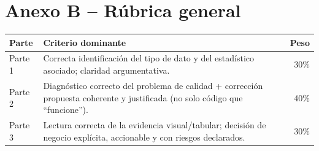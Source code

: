 \documentclass[11pt]{article}
\begin{document}
\section*{Anexo B -- Rúbrica general}
\begin{longtable}{p{2.5cm}p{9cm}r}
\toprule
Parte & Criterio dominante & Peso \\
\midrule
Parte 1 & Correcta identificación del tipo de dato y del estadístico asociado; claridad argumentativa. & 30\% \\
Parte 2 & Diagnóstico correcto del problema de calidad + corrección propuesta coherente y justificada (no solo código que ``funcione''). & 40\% \\
Parte 3 & Lectura correcta de la evidencia visual/tabular; decisión de negocio explícita, accionable y con riesgos declarados. & 30\% \\
\bottomrule
\end{longtable}
\end{document}

